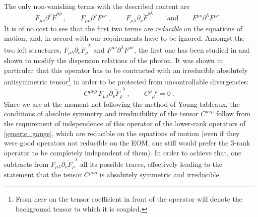 \documentclass[12pt,preprintnumbers,nofootinbib]{revtex4}
\newcommand{\p}{\partial}
\newcommand{\wt}{\widetilde}
\begin{document}
	The only non-vanishing terms with the described content are
\begin{equation}
\label{generic_gauge}
	F_{\mu\nu} \partial^\nu \widetilde{F}^{\mu\rho}~,\qquad
	F_{\mu\nu} \partial^\nu F^{\rho\sigma}~,\qquad
	F_{\mu\lambda} \partial_\nu \widetilde{F}^{\rho\lambda}\qquad
	\text{and}\qquad
	F^{\mu\nu} \partial^\lambda F^{\rho\sigma}~.
\end{equation}
	It is of no cost to see that the first two terms are {\it reducible}
	on the equations of motion, and, in accord with our requirements
	have to be ignored. 
	Amongst the two left structures, 
$ F_{\mu\lambda} \p_\nu \widetilde{F}_\rho^{\phantom{\rho}\lambda} $ and
$ F^{\mu\nu} \partial^\lambda F^{\rho\sigma} $,
	the first one has been studied in 
\cite{MP:} 
	and shown to modify the dispersion relations of the photon. 
	It was shown in particular that this operator has to be 
	contracted with an
	irreducible absolutely antisymmetric tensor\footnote{
	From here on the tensor coefficient in front of the operator
	will denote the background tensor to which it is coupled.}
	in order to be protected from uncontrollable divergencies:
\begin{equation}
\label{QED_gauge}
	C^{\mu\nu\rho}\, F_{\mu\lambda} \p_\nu 
	\wt{F}_\rho^{\phantom{\rho}\lambda}~,
	\qquad C^{\mu\phantom{\mu}\rho}_{\phantom{\mu}\mu} = 0~.
\end{equation}
	Since we are at the moment not following the method of Young tableaux,
	the conditions of absolute symmetry and irreducibility of
	the tensor $ C^{\mu\nu\rho} $ follow from the requirement of
	independence of this operator of the lower-rank operators
	of \eqref{generic_gauge}, which are reducible on the equations
	of motion
	(even if they were good operators not reducible on the EOM, 
	one still would prefer the 3-rank operator to be completely independent
	of them).
	In order to achieve that, one subtracts from 
$ F_{\mu\lambda} \p_\nu \wt{F}_\rho^{\phantom{\rho}\lambda} $
	all its possible traces, effectively leading to the statement
	that the tensor $ C^{\mu\nu\rho} $ is absolutely symmetric
	and irreducible.
\end{document}
